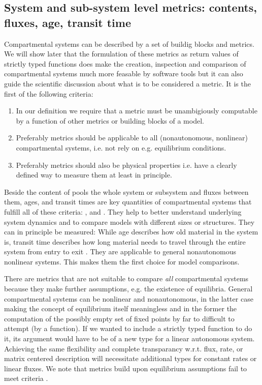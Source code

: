 \subsection{System and sub-system level metrics: contents, fluxes, age, transit time}
Compartmental systems can be described by a set of buildig blocks and metrics. 
We will show later that the formulation of these metrics as return values of
strictly typed functions does make the creation, inspection and
comparison of compartmental systems much more feasable by software tools  
but it can also guide the scientific discussion about what is to be considered a metric.
It is the first of the following criteria:
\begin{enumerate}
  \item
    \label{enum:function}
    In our definition we require that a metric must be unambigiously computable by a function of other metrics or building blocks of a model. 
  \item
    \label{enum:general}
    Preferably metrics should be applicable to all (nonautonomous, nonlinear) compartmental systems, i.e. not rely on e.g. equilibrium conditions.
  \item
    \label{enum:measurable}
  Preferably metrics should also be physical properties
  i.e. have a clearly defined way to measure them at least in principle.
\end{enumerate}

Beside the content of pools the whole system or subsystem and fluxes between
them, ages, and transit times are key quantities of compartmental systems that
fulfill all of these criteria: ,  and
.
They help to better understand underlying system dynamics and to compare models
with different sizes or structures.  They can in principle be measured: While
age describes how old material in the system is, transit time describes how
long material needs to travel through the entire system from entry to exit
\citep{bolin1973Tellus, Sierra2017GCB}.  They are applicable to general
nonautonomous nonlinear systems.  This makes them the first choice for model
comparisons. 

There are metrics that are not suitable to compare \emph{all} compartmental systems because they make further assumptions, e.g. the existence of equilibria. 
General compartmental systems can be nonlinear and nonautonomous, in the latter case making the concept of equilibrium itself meaningless and in the former the computation of the possibly empty set of fixed points by far to difficult to attempt (by a function).
If we wanted to include a strictly typed function to do it, its argument would
have to be of a new type for a linear autonomous system.  Achieving the same flexibility
and complete transparancy w.r.t. flux, rate, or matrix centered description
will necessitate additional types for constant rates or linear fluxes.
We note that metrics build upon equilibrium assumptions fail to meet criteria .

